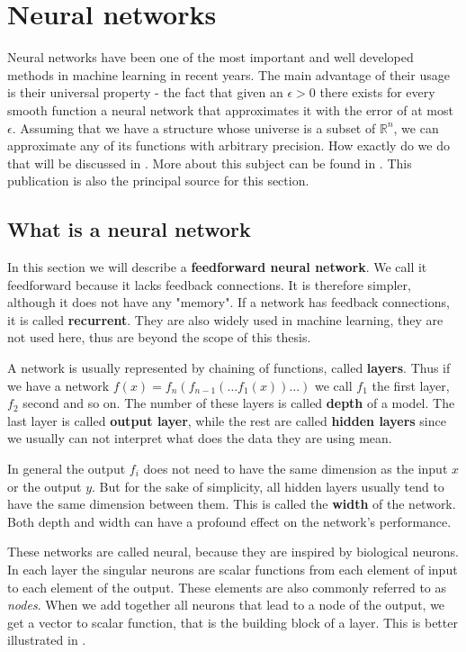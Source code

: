 \section{Neural networks}
Neural networks have been one of the most important and well developed methods in machine learning in recent years. The main advantage of their usage is their universal property - the fact that given an $\epsilon>0$ there exists for every smooth function a neural network that approximates it with the error of at most $\epsilon$. Assuming that we have a structure whose universe is a subset of $\mathbb{R}^n$, we can approximate any of its functions with arbitrary precision. How exactly do we do that will be discussed in . More about this subject can be found in \cite{neural}. This publication is also the principal source for this section.

\subsection{What is a neural network}
In this section we will describe a \textbf{feedforward neural network}. We call it feedforward because it lacks feedback connections. It is therefore simpler, although it does not have any "memory". If a network has feedback connections, it is called \textbf{recurrent}. They are also widely used in machine learning, they are not used here, thus are beyond the scope of this thesis.

A network is usually represented by chaining of functions, called \textbf{layers}. Thus if we have a network $f(x)=f_n(f_{n-1}(\dots f_1(x))\dots)$ we call $f_1$ the first layer, $f_2$ second and so on. The number of these layers is called \textbf{depth} of a model. The last layer is called \textbf{output layer}, while the rest are called \textbf{hidden layers} since we usually can not interpret what does the data they are using mean.

In general the output $f_i$ does not need to have the same dimension as the input $x$ or the output $y$. But for the sake of simplicity, all hidden layers usually tend to have the same dimension between them. This is called the \textbf{width} of the network. Both depth and width can have a profound effect on the network's performance. 

These networks are called neural, because they are inspired by biological neurons. In each layer the singular neurons are scalar functions from each element of input to each element of the output. These elements are also commonly referred to as \textit{nodes}. When we add together all neurons that lead to a node of the output, we get a vector to scalar function, that is the building block of a layer. This is better illustrated in .


